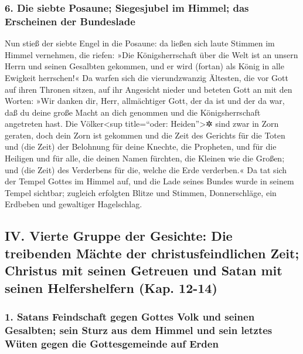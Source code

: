 \hypertarget{die-siebte-posaune-siegesjubel-im-himmel-das-erscheinen-der-bundeslade}{%
\subsubsection{6. Die siebte Posaune; Siegesjubel im Himmel; das
Erscheinen der
Bundeslade}\label{die-siebte-posaune-siegesjubel-im-himmel-das-erscheinen-der-bundeslade}}

 Nun stieß der siebte Engel in die Posaune: da ließen
sich laute Stimmen im Himmel vernehmen, die riefen: »Die
Königsherrschaft über die Welt ist an unsern Herrn und seinen Gesalbten
gekommen, und er wird (fortan) als König in alle Ewigkeit herrschen!«
 Da warfen sich die vierundzwanzig Ältesten, die vor Gott
auf ihren Thronen sitzen, auf ihr Angesicht nieder und beteten Gott an
 mit den Worten: »Wir danken dir, Herr, allmächtiger
Gott, der da ist und der da war, daß du deine große Macht an dich
genommen und die Königsherrschaft angetreten hast.  Die
Völker\textless sup title=``oder: Heiden''\textgreater✲ sind zwar in
Zorn geraten, doch dein Zorn ist gekommen und die Zeit des Gerichts für
die Toten und (die Zeit) der Belohnung für deine Knechte, die Propheten,
und für die Heiligen und für alle, die deinen Namen fürchten, die
Kleinen wie die Großen; und (die Zeit) des Verderbens für die, welche
die Erde verderben.«  Da tat sich der Tempel Gottes im
Himmel auf, und die Lade seines Bundes wurde in seinem Tempel sichtbar;
zugleich erfolgten Blitze und Stimmen, Donnerschläge, ein Erdbeben und
gewaltiger Hagelschlag.

\hypertarget{iv.-vierte-gruppe-der-gesichte-die-treibenden-muxe4chte-der-christusfeindlichen-zeit-christus-mit-seinen-getreuen-und-satan-mit-seinen-helfershelfern-kap.-12-14}{%
\subsection{IV. Vierte Gruppe der Gesichte: Die treibenden Mächte der
christusfeindlichen Zeit; Christus mit seinen Getreuen und Satan mit
seinen Helfershelfern (Kap.
12-14)}\label{iv.-vierte-gruppe-der-gesichte-die-treibenden-muxe4chte-der-christusfeindlichen-zeit-christus-mit-seinen-getreuen-und-satan-mit-seinen-helfershelfern-kap.-12-14}}

\hypertarget{satans-feindschaft-gegen-gottes-volk-und-seinen-gesalbten-sein-sturz-aus-dem-himmel-und-sein-letztes-wuxfcten-gegen-die-gottesgemeinde-auf-erden}{%
\subsubsection{1. Satans Feindschaft gegen Gottes Volk und seinen
Gesalbten; sein Sturz aus dem Himmel und sein letztes Wüten gegen die
Gottesgemeinde auf
Erden}\label{satans-feindschaft-gegen-gottes-volk-und-seinen-gesalbten-sein-sturz-aus-dem-himmel-und-sein-letztes-wuxfcten-gegen-die-gottesgemeinde-auf-erden}}

